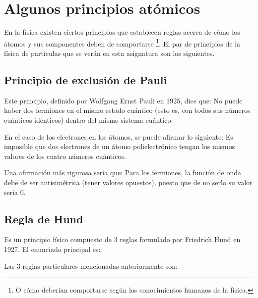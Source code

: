 \section{Algunos principios atómicos}

En la física existen ciertos principios que establecen reglas acerca de cómo los átomos y sus componentes deben de comportarse \footnote{O cómo deberían comportarse según los conocimientos humanos de la física.}. El par de principios de la física de partículas que se verán en esta asignatura son los siguientes.

\subsection{Principio de exclusión de Pauli}

Este principio, definido por Wolfgang Ernst Pauli en 1925, dice que: No puede haber dos fermiones en el mismo estado cuántico (esto es, con todos sus números cuánticos idénticos) dentro del mismo sistema cuántico.


En el caso de los electrones en los átomos, se puede afirmar lo siguiente: Es imposible que dos electrones de un átomo polielectrónico tengan los mismos valores de los cuatro números cuánticos.

Una afirmación más rigurosa sería que: Para los fermiones, la función de onda debe de ser antisimétrica (tener valores opuestos), puesto que de no serlo su valor sería 0.

\subsection{Regla de Hund}

Es un principio físico compuesto de 3 reglas formulado por Friedrich Hund en 1927. El enunciado principal es:


Las 3 reglas particulares mencionadas anteriormente son:

